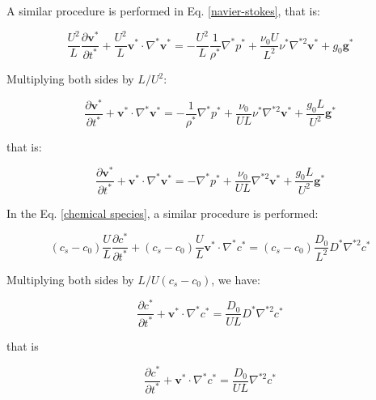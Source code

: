 \medskip
\noindent
A similar procedure is performed in
Eq. \ref{navier-stokes}, that is:

\begin{equation}
 \frac{U^{2}}{L} \frac{\partial \textbf{v$^{*}$}}{\partial t^{*}} 
 + 
 \frac{U^{2}}{L} \textbf{v$^{*}$} \cdot \nabla^{*} \textbf{v$^{*}$}
 =
 -
 \frac{U^{2}}{L} \frac{1}{\rho^{*}} \nabla^{*} p^{*}
 +
 \frac{\nu_{0} U}{L^{2}} \nu^{*} \nabla^{*2} \textbf{v$^{*}$}
 +
 g_{0} \textbf{g$^{*}$}
\end{equation}

\medskip
\noindent
Multiplying both sides by $L/U^{2}$:

\begin{equation} \label{navier-stokes adimensional 2}
 \frac{\partial \textbf{v$^{*}$}}{\partial t^{*}} 
 + 
 \textbf{v$^{*}$} \cdot \nabla^{*} \textbf{v$^{*}$}
 =
 -
 \frac{1}{\rho^{*}} \nabla^{*} p^{*}
 +
 \frac{\nu_{0}}{UL} \nu^{*} \nabla^{*2} \textbf{v$^{*}$}
 +
 \frac{g_{0}L}{U^{2}} \textbf{g$^{*}$}
\end{equation}

\medskip
\noindent
that is:

\begin{equation} \label{navier-stokes adimensional 1}
 \frac{\partial \textbf{v$^{*}$}}{\partial t^{*}} 
 + 
 \textbf{v$^{*}$} \cdot \nabla^{*} \textbf{v$^{*}$}
 =
 -
 \nabla^{*} p^{*}
 +
 \frac{\nu_{0}}{UL} \nabla^{*2} \textbf{v$^{*}$}
 +
 \frac{g_{0}L}{U^{2}} \textbf{g$^{*}$}
\end{equation}

\medskip
\noindent
In the Eq. \ref{chemical species}, a similar procedure is performed:

\begin{equation}
 (c_{s}-c_{0}) \frac{U}{L} \frac{\partial c^{*}}{\partial t^{*}}
 +
 (c_{s}-c_{0}) \frac{U}{L} \textbf{v$^{*}$} \cdot \nabla^{*} c^{*}
 =
 (c_{s}-c_{0}) \frac{D_{0}}{L^{2}} D^{*} \nabla^{*2} c^{*}
\end{equation}

\medskip
\noindent
Multiplying both sides by $L/U(c_{s}-c_{0})$, we have:

\begin{equation} \label{especie quimica adimensional 2}
 \frac{\partial c^{*}}{\partial t^{*}}
 +
 \textbf{v$^{*}$} \cdot \nabla^{*} c^{*}
 =
 \frac{D_{0}}{UL} D^{*} \nabla^{*2} c^{*}
\end{equation}

\medskip
\noindent
that is

\begin{equation} \label{especie quimica adimensional 1}
 \frac{\partial c^{*}}{\partial t^{*}}
 +
 \textbf{v$^{*}$} \cdot \nabla^{*} c^{*}
 =
 \frac{D_{0}}{UL} \nabla^{*2} c^{*}
\end{equation}

